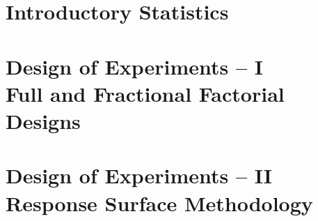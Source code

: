 


%
%

\frontmatter




\mainmatter


\part{Introductory Statistics}


\part{Design of Experiments -- I\\
Full and Fractional Factorial Designs}


\part{Design of Experiments -- II\\
Response Surface Methodology}


\cleardoublepage

\begin{appendices}
	
	
	
	
\end{appendices}

\backmatter

\cleardoublepage
{}

\printbibliography
\cleardoublepage

{}


\makeatletter
\@openrightfalse
\makeatother



